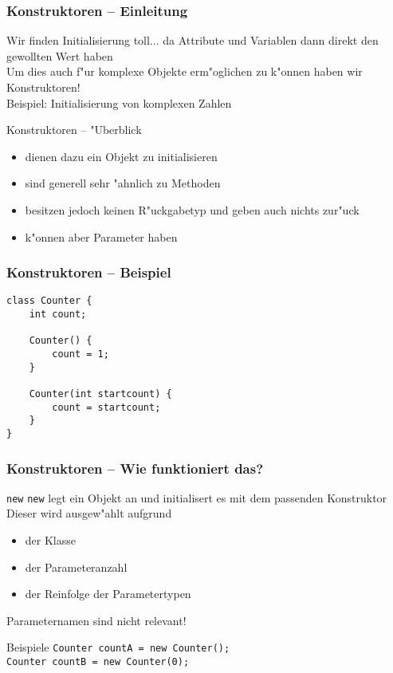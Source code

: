 \documentclass{beamer}
\begin{document}
\begin{frame}
\frametitle{Konstruktoren -- Einleitung}
\begin{block}{Wir finden Initialisierung toll...}
\pause
da Attribute und Variablen dann direkt den gewollten Wert haben\pause\\
Um dies auch f"ur komplexe Objekte erm"oglichen zu k"onnen haben wir Konstruktoren!\\[0.5em]
Beispiel: Initialisierung von komplexen Zahlen
\end{block}

\pause

\begin{block}{Konstruktoren -- "Uberblick}
\begin{itemize}
\item dienen dazu ein Objekt zu initialisieren\\
\item sind generell sehr "ahnlich zu Methoden\\
\item besitzen jedoch \alert{keinen R"uckgabetyp} und geben auch nichts zur"uck\\
\item k"onnen aber Parameter haben
\end{itemize}
\end{block}
\end{frame}


\begin{frame}[containsverbatim]
\frametitle{Konstruktoren -- Beispiel}
\begin{lstlisting}
class Counter {
	int count;

	Counter() {
		count = 1;
	}

	Counter(int startcount) {
		count = startcount;
	}
}
\end{lstlisting}
\end{frame}


\begin{frame}
\frametitle{Konstruktoren -- Wie funktioniert das?}
\begin{block}{\texttt{new}}
\texttt{new} legt ein Objekt an und initialisert es mit dem passenden Konstruktor
Dieser wird ausgew"ahlt aufgrund
\begin{itemize}
\item der Klasse\\
\item der Parameteranzahl\\
\item der Reinfolge der Parametertypen
\end{itemize}
\alert{Parameternamen sind nicht relevant!}
\end{block}

\pause

\begin{block}{Beispiele}
\lstinline|Counter countA = new Counter();|\\
\lstinline|Counter countB = new Counter(0);|
\end{block}
\end{frame}
\end{document}
